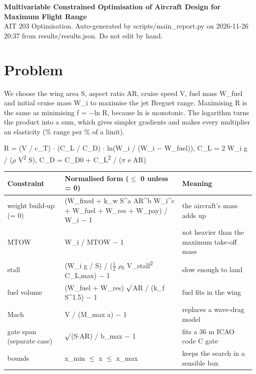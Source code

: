 \documentclass[10pt,a4paper]{article}
\begin{document}
\begin{center}{\Large\bfseries Multivariable Constrained Optimisation of Aircraft Design for Maximum Flight Range}\\[4pt]
{\small AIT 203 Optimisation. Auto-generated by scripts/main\_report.py on 2026-11-26 20:37 from results/results.json. Do not edit by hand.}\end{center}
\section{Problem}
We choose the wing area S, aspect ratio AR, cruise speed V, fuel mass W\_fuel and initial cruise mass W\_i to maximise the jet Breguet range. Maximising R is the same as minimising f = $-$ln R, because ln is monotonic. The logarithm turns the product into a sum, which gives simpler gradients and makes every multiplier an elasticity (\% range per \% of a limit).

R = (V / c\_T) $\cdot$ (C\_L / C\_D) $\cdot$ ln(W\_i / (W\_i $-$ W\_fuel)),   C\_L = 2 W\_i g / ($\rho$ V\textsuperscript{2} S),   C\_D = C\_D0 + C\_L\textsuperscript{2} / ($\pi$ e AR)

\begin{table}[H]\centering\small
\begin{tabularx}{\textwidth}{l>{\raggedright\arraybackslash}X>{\raggedright\arraybackslash}X}
\toprule
\textbf{Constraint} & \textbf{Normalised form ($\le$ 0 unless = 0)} & \textbf{Meaning} \\
\midrule
weight build-up (= 0) & (W\_fixed + k\_w S\textasciicircum{}a AR\textasciicircum{}b W\_i\textasciicircum{}c + W\_fuel + W\_res + W\_pay) / W\_i $-$ 1 & the aircraft's mass adds up \\
MTOW & W\_i / MTOW $-$ 1 & not heavier than the maximum take-off mass \\
stall & (W\_i g / S) / ($\frac{1}{2}$ $\rho$$_0$ V\_stall\textsuperscript{2} C\_L,max) $-$ 1 & slow enough to land \\
fuel volume & (W\_fuel + W\_res) $\surd$AR / (k\_f S\textasciicircum{}1.5) $-$ 1 & fuel fits in the wing \\
Mach & V / (M\_max a) $-$ 1 & replaces a wave-drag model \\
gate span (separate case) & $\surd$(S$\cdot$AR) / b\_max $-$ 1 & fits a 36 m ICAO code C gate \\
bounds & x\_min $\le$ x $\le$ x\_max & keeps the search in a sensible box \\
\bottomrule
\end{tabularx}
\end{table}
\end{document}
